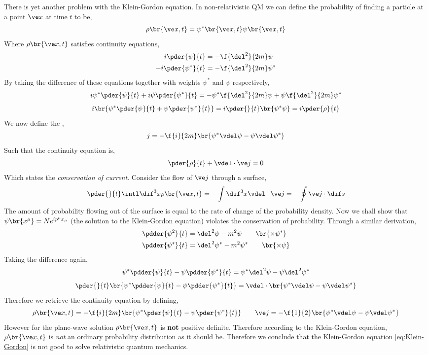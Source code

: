 \documentclass{article}
\begin{document}
There is yet another problem with the Klein-Gordon equation. In non-relativistic QM we can define the probability of finding a particle at a point $\ve x$ at time $t$ to be,
\[ \rho\br{\ve x, t} = \psi^{*}\br{\ve x, t} \psi\br{\ve x, t} \]
Where $\rho\br{\ve x, t}$ satisfies continuity equations,
\begin{align*}
    i \pder{\psi}{t} &= - \f{\del^2}{2m} \psi \\
    -i \pder{\psi^*}{t} &= - \f{\del^2}{2m} \psi^*
\end{align*}
By taking the difference of these equations together with weights $\psi^{*}$ and $\psi$ respectively,
\[ i \psi^{*} \pder{\psi}{t} + i \psi \pder{\psi^*}{t} = - \psi^{*} \f{\del^2}{2m} \psi + \psi \f{\del^2}{2m} \psi^{*} \]
\[ i \br{\psi^{*} \pder{\psi}{t} + \psi \pder{\psi^*}{t}} = i \pder{}{t}\br{\psi^{*} \psi} = i \pder{\rho}{t} \]
We now define the ,
\[ j = -\f{i}{2m}\br{\psi^{*} \vdel \psi - \psi \vdel \psi^{*}} \]
Such that the continuity equation is,
\[ \pder{\rho}{t} + \vdel \cdot \ve j = 0 \]
Which states the \textit{conservation of current}. Consider the flow of $\ve j$ through a surface,
\[ \pder{}{t} \intl \dif^3 x \rho \br{\ve x, t} = - \int \dif^3 x \vdel \cdot \ve j = - \oint \ve j \cdot \dif s \]
The amount of probability flowing out of the surface is equal to the rate of change of the probability density. Now we shall show that $\psi\br{x^{\mu}} = N e^{i p^{\mu} x_{\mu}}$ (the solution to the Klein-Gordon equation) violates the conservation of probability. Through a similar derivation,
\begin{align*}
\pdder{\psi^2}{t} &= \del^2 \psi - m^2 \psi \qquad \br{\times \psi^{*}} \\
\pdder{{\psi^*}}{t} &= \del^2 \psi^{*} - m^2 \psi^{*} \qquad \br{\times \psi}
\end{align*}
Taking the difference again,
\[ \psi^{*} \pdder{\psi}{t} - \psi \pdder{\psi^{*}}{t} = \psi^{*} \del^2 \psi - \psi \del^2 \psi^{*} \]
\[ \pder{}{t}\br{\psi^{*} \pdder{\psi}{t} - \psi \pdder{\psi^{*}}{t}} = \vdel \cdot \br{\psi^{*} \vdel \psi - \psi \vdel \psi^{*}} \]
Therefore we retrieve the continuity equation by defining,
\[ \rho\br{\ve x, t} = - \f{i}{2m} \br{\psi^{*} \pder{\psi}{t} - \psi \pder{\psi^*}{t}} \qquad \ve j = - \f{1}{2} \br{\psi^{*} \vdel \psi - \psi \vdel \psi^{*}}\]
However for the plane-wave solution $\rho\br{\ve x, t}$ is \textbf{not} positive definite. Therefore according to the Klein-Gordon equation, $\rho\br{\ve x, t}$ is \textit{not} an ordinary probability distribution as it should be. Therefore we conclude that the Klein-Gordon equation \cref{eq:Klein-Gordon} is not good to solve relativistic quantum mechanics.
\end{document}
